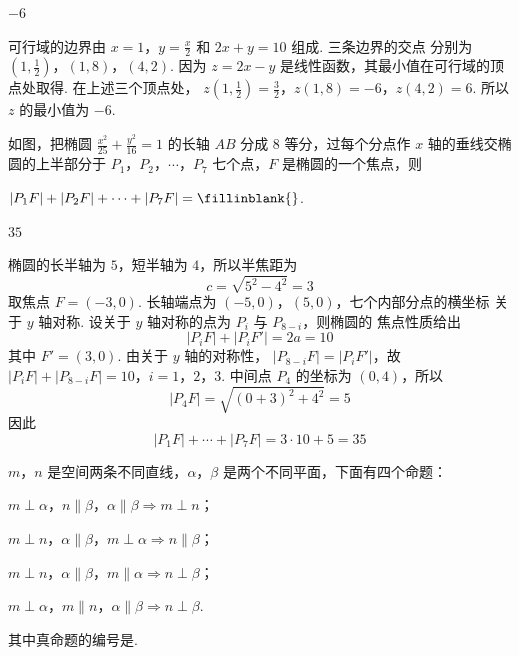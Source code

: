 \begin{answer}
\(-6\)
\end{answer}

\begin{solution}
可行域的边界由 \(x=1\)，\(y=\frac{x}{2}\) 和 \(2x+y=10\) 组成. 三条边界的交点
分别为
\(\left(1,\frac12\right)\)，\((1,8)\)，\((4,2)\).
因为 \(z=2x-y\) 是线性函数，其最小值在可行域的顶点处取得. 在上述三个顶点处，
\(z\left(1,\frac12\right)=\frac32\)，\(z(1,8)=-6\)，\(z(4,2)=6\).
所以 \(z\) 的最小值为 \(-6\).
\end{solution}

\begin{problem}
如图，把椭圆 \(\frac{x^2}{25} + \frac{y^2}{16} = 1\) 的长轴 \(AB\) 分成 \(8\) 等分，过每个分点作 \(x\) 轴的垂线交椭圆的上半部分于 \(P_1\)，\(P_2\)，\(\cdots\)，\(P_7\) 七个点，\(F\) 是椭圆的一个焦点，则

\(|P_1F| + |P_2F| + \cdots + |P_7F| =\fillinblank{}\).

\problemresetlayout
{}
\end{problem}

\begin{answer}
\(35\)
\end{answer}

\begin{solution}
椭圆的长半轴为 \(5\)，短半轴为 \(4\)，所以半焦距为
\[
c=\sqrt{5^2-4^2}=3
\]
取焦点 \(F=(-3,0)\). 长轴端点为 \((-5,0)\)，\((5,0)\)，七个内部分点的横坐标
关于 \(y\) 轴对称. 设关于 \(y\) 轴对称的点为 \(P_i\) 与 \(P_{8-i}\)，则椭圆的
焦点性质给出
\[
|P_iF|+|P_iF'|=2a=10
\]
其中 \(F'=(3,0)\). 由关于 \(y\) 轴的对称性，
\(|P_{8-i}F|=|P_iF'|\)，故
\(|P_iF|+|P_{8-i}F|=10\)，\(i=1\)，\(2\)，\(3\).
中间点 \(P_4\) 的坐标为 \((0,4)\)，所以
\[
|P_4F|=\sqrt{(0+3)^2+4^2}=5
\]
因此
\[
|P_1F|+\cdots+|P_7F|=3\cdot10+5=35
\]
\end{solution}

\begin{problem}
\(m\)，\(n\) 是空间两条不同直线，\(\alpha\)，\(\beta\) 是两个不同平面，下面有四个命题：

\begin{circlelist}
\item \(m \perp \alpha\)，\(n \parallel \beta\)，\(\alpha \parallel \beta \Rightarrow m \perp n\)；
\item \(m \perp n\)，\(\alpha \parallel \beta\)，\(m \perp \alpha \Rightarrow n \parallel \beta\)；
\item \(m \perp n\)，\(\alpha \parallel \beta\)，\(m \parallel \alpha \Rightarrow n \perp \beta\)；
\item \(m \perp \alpha\)，\(m \parallel n\)，\(\alpha \parallel \beta \Rightarrow n \perp \beta\).
\end{circlelist}

其中真命题的编号是\fillinblank{}.
\end{problem}

